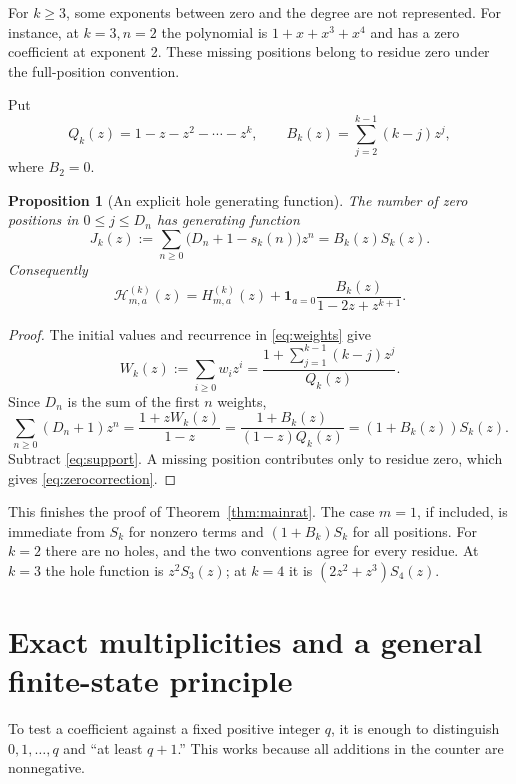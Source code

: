 \documentclass[11pt,letterpaper]{article}
\numberwithin{equation}{section}
\newtheorem{proposition}[theorem]{Proposition}
\theoremstyle{definition}
\theoremstyle{remark}
\newcommand{\one}{\mathbf 1}
\newcommand{\cH}{\mathcal H}
\begin{document}
For $k\ge3$, some exponents between zero and the degree are not represented.
For instance, at $k=3,n=2$ the polynomial is
$1+x+x^3+x^4$ and has a zero coefficient at exponent 2. These missing
positions belong to residue zero under the full-position convention.

Put
\begin{equation}
 Q_k(z)=1-z-z^2-\cdots-z^k,
 \qquad B_k(z)=\sum_{j=2}^{k-1}(k-j)z^j,
 \label{eq:QB}
\end{equation}
where $B_2=0$.

\begin{proposition}[An explicit hole generating function]
\label{prop:holes}
The number of zero positions in $0\le j\le D_n$ has generating function
\begin{equation}
 J_k(z):=\sum_{n\ge0}\bigl(D_n+1-s_k(n)\bigr)z^n
 =B_k(z)S_k(z).
 \label{eq:holes}
\end{equation}
Consequently
\begin{equation}
 \cH_{m,a}^{(k)}(z)=H_{m,a}^{(k)}(z)
       +\one_{a=0}\frac{B_k(z)}{1-2z+z^{k+1}}.
 \label{eq:zerocorrection}
\end{equation}
\end{proposition}
\begin{proof}
The initial values and recurrence in \eqref{eq:weights} give
\[
 W_k(z):=\sum_{i\ge0}w_i z^i
 =\frac{1+\sum_{j=1}^{k-1}(k-j)z^j}{Q_k(z)}.
\]
Since $D_n$ is the sum of the first $n$ weights,
\begin{equation}
 \sum_{n\ge0}(D_n+1)z^n
 =\frac{1+zW_k(z)}{1-z}
 =\frac{1+B_k(z)}{(1-z)Q_k(z)}
 =(1+B_k(z))S_k(z).
 \label{eq:degreegf}
\end{equation}
Subtract \eqref{eq:support}. A missing position contributes only to
residue zero, which gives \eqref{eq:zerocorrection}.
\end{proof}

This finishes the proof of Theorem~\ref{thm:mainrat}. The case $m=1$, if
included, is immediate from $S_k$ for nonzero terms and $(1+B_k)S_k$ for
all positions. For $k=2$ there are no holes, and the two conventions agree
for every residue. At $k=3$ the hole function is $z^2S_3(z)$; at $k=4$ it
is $(2z^2+z^3)S_4(z)$.

\section{Exact multiplicities and a general finite-state principle}
\label{sec:exact}

To test a coefficient against a fixed positive integer $q$, it is enough
to distinguish $0,1,\ldots,q$ and ``at least $q+1$.'' This works because
all additions in the counter are nonnegative.
\end{document}
